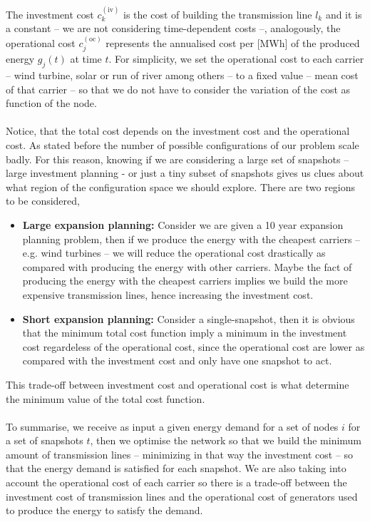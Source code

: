 The investment cost $c_{k}^{(\text{iv})}$ is the cost of building the transmission line $l_{k}$ and it is a constant -- we are not considering time-dependent costs --, analogously, the operational cost $c_{j}^{(\text{oc})}$ represents the annualised cost per [MWh] of the produced energy $g_{j}(t)$ at time $t$. For simplicity, we set the operational cost to each carrier -- wind turbine, solar or run of river among others -- to a fixed value -- mean cost of that carrier -- so that we do not have to consider the variation of the cost as function of the node.\\\\
Notice, that the total cost depends on the investment cost and the operational cost. As stated before the number of possible configurations of our problem scale badly. For this reason, knowing if we are considering a large set of snapshots -- large investment planning - or just a tiny subset of snapshots gives us clues about what region of the configuration space we should explore. There are two regions to be considered,
\begin{itemize}
    \item \textbf{Large expansion planning:} Consider we are given a 10 year expansion planning problem, then if we produce the energy with the  cheapest carriers -- e.g. wind turbines -- we will reduce the operational cost drastically as compared with producing the energy with other carriers. Maybe the fact of producing the energy with the cheapest carriers implies we build the more expensive transmission lines, hence increasing the investment cost.
    \item \textbf{Short expansion planning:} Consider a single-snapshot, then it is obvious that the minimum total cost function imply a minimum in the investment cost regardeless of the operational cost, since the operational cost are lower as compared with the investment cost and only have one snapshot to act.
\end{itemize}
This trade-off between investment cost and operational cost is what determine the minimum value of the total cost function.\\\\
To summarise, we receive as input a given energy demand for a set of nodes $i$ for a set of snapshots $t$, then we optimise the network so that we build the minimum amount of transmission lines -- minimizing in that way the investment cost -- so that the energy demand is satisfied for each snapshot. We are also taking into account the operational cost of each carrier so there is a trade-off between the investment cost of transmission lines and the operational cost of generators used to produce the energy to satisfy the demand.

